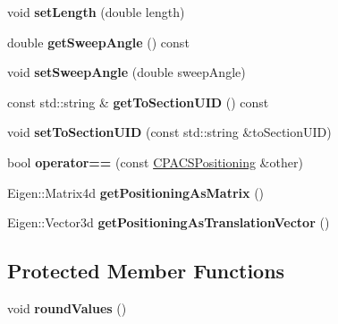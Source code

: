 \begin{DoxyCompactItemize}
\item 
\hypertarget{classcpcr_1_1CPACSPositioning_adeb9e8fd5f72217a41cc600de5bca5d0}{void {\bfseries set\-Length} (double length)}\label{classcpcr_1_1CPACSPositioning_adeb9e8fd5f72217a41cc600de5bca5d0}

\item 
\hypertarget{classcpcr_1_1CPACSPositioning_a0b4aa5dbf30369a27c8045b8c69cd64d}{double {\bfseries get\-Sweep\-Angle} () const }\label{classcpcr_1_1CPACSPositioning_a0b4aa5dbf30369a27c8045b8c69cd64d}

\item 
\hypertarget{classcpcr_1_1CPACSPositioning_a99305e3aa4d221503d96bda35e637c35}{void {\bfseries set\-Sweep\-Angle} (double sweep\-Angle)}\label{classcpcr_1_1CPACSPositioning_a99305e3aa4d221503d96bda35e637c35}

\item 
\hypertarget{classcpcr_1_1CPACSPositioning_a926b75157d0c9c8cbb069ceacd803cd6}{const std\-::string \& {\bfseries get\-To\-Section\-U\-I\-D} () const }\label{classcpcr_1_1CPACSPositioning_a926b75157d0c9c8cbb069ceacd803cd6}

\item 
\hypertarget{classcpcr_1_1CPACSPositioning_a43c8f9f1adeb49823c19445fef8a068f}{void {\bfseries set\-To\-Section\-U\-I\-D} (const std\-::string \&to\-Section\-U\-I\-D)}\label{classcpcr_1_1CPACSPositioning_a43c8f9f1adeb49823c19445fef8a068f}

\item 
\hypertarget{classcpcr_1_1CPACSPositioning_a9bcd298b27999dc209ae37c8d7f822da}{bool {\bfseries operator==} (const \hyperlink{classcpcr_1_1CPACSPositioning}{C\-P\-A\-C\-S\-Positioning} \&other)}\label{classcpcr_1_1CPACSPositioning_a9bcd298b27999dc209ae37c8d7f822da}

\item 
\hypertarget{classcpcr_1_1CPACSPositioning_a387ccab79c191031725f5500831db0de}{Eigen\-::\-Matrix4d {\bfseries get\-Positioning\-As\-Matrix} ()}\label{classcpcr_1_1CPACSPositioning_a387ccab79c191031725f5500831db0de}

\item 
\hypertarget{classcpcr_1_1CPACSPositioning_a3ba38892fab7fe0031aa4107b268059d}{Eigen\-::\-Vector3d {\bfseries get\-Positioning\-As\-Translation\-Vector} ()}\label{classcpcr_1_1CPACSPositioning_a3ba38892fab7fe0031aa4107b268059d}

\end{DoxyCompactItemize}
\subsection*{Protected Member Functions}
\begin{DoxyCompactItemize}
\item 
\hypertarget{classcpcr_1_1CPACSPositioning_af114a1072c77f6cb0ebeb7a8cb66d9eb}{void {\bfseries round\-Values} ()}\label{classcpcr_1_1CPACSPositioning_af114a1072c77f6cb0ebeb7a8cb66d9eb}

\end{DoxyCompactItemize}


